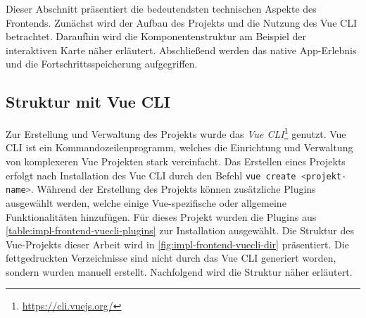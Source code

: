 Dieser Abschnitt präsentiert die bedeutendsten technischen Aspekte des
Frontends. Zunächst wird der Aufbau des Projekts und die Nutzung des Vue CLI
betrachtet. Daraufhin wird die Komponentenstruktur am Beispiel der interaktiven
Karte näher erläutert. Abschließend werden das native App-Erlebnis und die
Fortschrittsspeicherung aufgegriffen.

\subsection{Struktur mit Vue CLI} \label{ssec:impl-frontend-structure}

Zur Erstellung und Verwaltung des Projekts wurde das \textit{Vue
CLI}\footnote{\url{https://cli.vuejs.org/}} genutzt. Vue CLI ist ein
Kommandozeilenprogramm, welches die Einrichtung und Verwaltung von komplexeren
Vue Projekten stark vereinfacht. Das Erstellen eines Projekts erfolgt nach
Installation des Vue CLI durch den Befehl \lstinline[style=code, language=bash,
style=inline]{vue create <projekt-name>}. Während der Erstellung des Projekts
können zusätzliche Plugins ausgewählt werden, welche einige Vue-spezifische oder
allgemeine Funktionalitäten hinzufügen. Für dieses Projekt wurden die Plugins
aus \autoref{table:impl-frontend-vuecli-plugins} zur Installation ausgewählt.
Die Struktur des Vue-Projekts dieser Arbeit wird in
\autoref{fig:impl-frontend-vuecli-dir} präsentiert. Die fettgedruckten
Verzeichnisse sind nicht durch das Vue CLI generiert worden, sondern wurden
manuell erstellt. Nachfolgend wird die Struktur näher erläutert.

